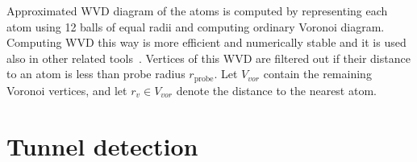 \documentclass{llncs}
\def\C{\mathcal{C}}
\def\VV{V_{vor}}
\def\probe{r_{\mathrm{probe}}}
\def\Sprobe{S_{\mathrm{probe}}}
\begin{document}
Approximated WVD diagram of the atoms is computed by representing each atom using 12 balls of equal radii and computing ordinary Voronoi diagram.
Computing WVD this way is more efficient and numerically stable and it is used also in other related tools~\cite{caver3,yaffe2008}.
Vertices of this WVD are filtered out if their distance to an atom is less than probe radius $\probe$.
Let $\VV$ contain the remaining Voronoi vertices, and let $r_v \in \VV$ denote the distance to the nearest atom.






\section{Tunnel detection}
\end{document}

